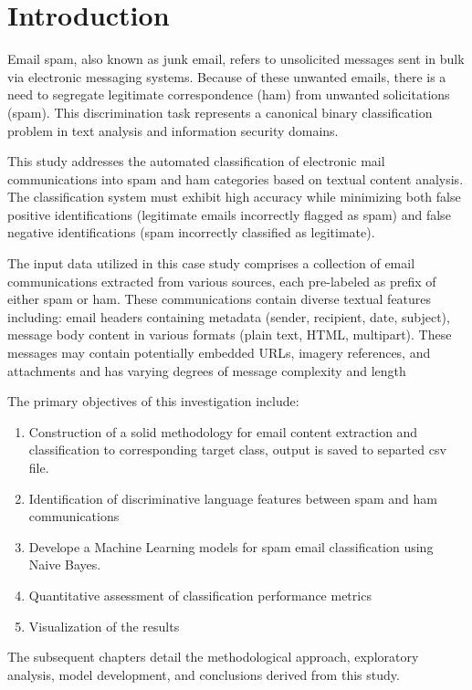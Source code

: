 \chapter{Introduction}

Email spam, also known as junk email, refers to unsolicited messages sent in bulk via electronic messaging systems. 
Because of these unwanted emails, there is a need to segregate legitimate correspondence (ham) from unwanted solicitations (spam). 
This discrimination task represents a canonical binary classification problem in text analysis and information security domains.

This study addresses the automated classification of electronic mail communications into spam and ham categories based on textual content analysis. 
The classification system must exhibit high accuracy while minimizing both false positive identifications (legitimate emails incorrectly flagged as spam) and false negative identifications (spam incorrectly classified as legitimate).

The input data utilized in this case study comprises a collection of email communications extracted from various sources, each pre-labeled as prefix of either spam or ham. These communications contain diverse textual features including:
email headers containing metadata (sender, recipient, date, subject), message body content in various formats (plain text, HTML, multipart). These messages may contain potentially embedded URLs, imagery references, and attachments and has 
varying degrees of message complexity and length

The primary objectives of this investigation include:

\begin{enumerate}
    \item Construction of a solid methodology for email content extraction and classification to corresponding target class, output is saved to separted csv file.
    \item Identification of discriminative language features between spam and ham communications
    \item Develope a Machine Learning models for spam email classification using Naive Bayes.
    \item Quantitative assessment of classification performance metrics
    \item Visualization of the results
\end{enumerate}

The subsequent chapters detail the methodological approach, exploratory analysis, model development, and conclusions derived from this study. 